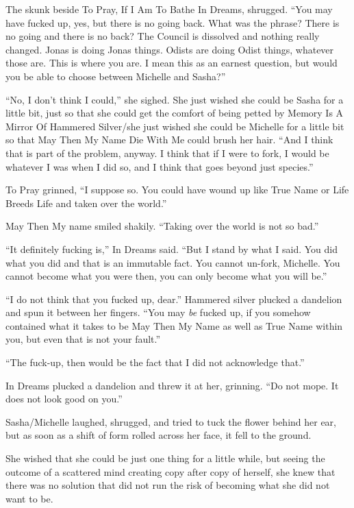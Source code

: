 The skunk beside To Pray, If I Am To Bathe In Dreams, shrugged. ``You may have fucked up, yes, but there is no going back. What was the phrase? There is no going and there is no back? The Council is dissolved and nothing really changed. Jonas is doing Jonas things. Odists are doing Odist things, whatever those are. This is where you are. I mean this as an earnest question, but would you be able to choose between Michelle and Sasha?''

``No, I don't think I could,'' she sighed. She just wished she could be Sasha for a little bit, just so that she could get the comfort of being petted by Memory Is A Mirror Of Hammered Silver/she just wished she could be Michelle for a little bit so that May Then My Name Die With Me could brush her hair. ``And I think that is part of the problem, anyway. I think that if I were to fork, I would be whatever I was when I did so, and I think that goes beyond just species.''

To Pray grinned, ``I suppose so. You could have wound up like True Name or Life Breeds Life and taken over the world.''

May Then My name smiled shakily. ``Taking over the world is not so bad.''

``It definitely fucking is,'' In Dreams said. ``But I stand by what I said. You did what you did and that is an immutable fact. You cannot un-fork, Michelle. You cannot become what you were then, you can only become what you will be.''

``I do not think that you fucked up, dear.'' Hammered silver plucked a dandelion and spun it between her fingers. ``You may \emph{be} fucked up, if you somehow contained what it takes to be May Then My Name as well as True Name within you, but even that is not your fault.''

``The fuck-up, then would be the fact that I did not acknowledge that.''

In Dreams plucked a dandelion and threw it at her, grinning. ``Do not mope. It does not look good on you.''

Sasha/Michelle laughed, shrugged, and tried to tuck the flower behind her ear, but as soon as a shift of form rolled across her face, it fell to the ground.

She wished that she could be just one thing for a little while, but seeing the outcome of a scattered mind creating copy after copy of herself, she knew that there was no solution that did not run the risk of becoming what she did not want to be.

